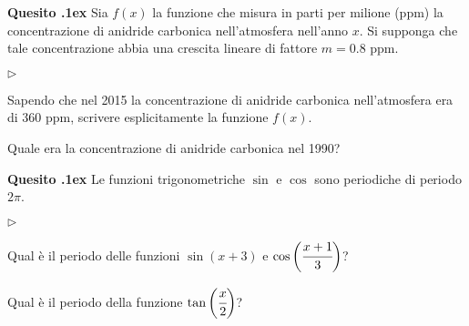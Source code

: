 \documentclass[11pt,twoside,a4paper]{article}
\newcommand{\mylabel}[1]{#1\hfill}
\renewenvironment{itemize}
  {\begin{list}{$\triangleright$}{%
   \setlength{\parskip}{0mm}
   \setlength{\topsep}{.4\baselineskip}
   \setlength{\rightmargin}{0mm}
   \setlength{\listparindent}{0mm}
   \setlength{\itemindent}{0mm}
   \setlength{\labelwidth}{2ex}
   \setlength{\itemsep}{.4\baselineskip}
   \setlength{\parsep}{0mm}
   \setlength{\partopsep}{0mm}
   \setlength{\labelsep}{1ex}
   \setlength{\leftmargin}{\labelwidth+\labelsep}
   \let\makelabel\mylabel}}{%
   \end{list}\vspace*{-1.3mm}}
\newcounter{quesito}
\newenvironment{question}{\bigskip\addtocounter{quesito}{1}\bigskip\bigskip\par\textbf{Quesito \thequesito.\kern1ex}}{\vspace{\parskip}}
\newenvironment{answer}{\par\textbf{Risposta\quad}}{\vspace{\parskip}}
\begin{document}
\begin{question}
Sia $f(x)$ la funzione che misura in parti per milione (ppm) la concentrazione di anidride carbonica nell'atmosfera nell'anno $x$. Si supponga che tale concentrazione abbia una crescita lineare di fattore $m = 0.8$ ppm.
\begin{itemize}
\item[1.] Sapendo che nel 2015 la concentrazione di anidride carbonica nell'atmosfera era di 360 ppm, scrivere esplicitamente la funzione $f(x)$.
\item[2.] Quale era la concentrazione di anidride carbonica nel 1990?
\end{itemize}
\end{question}

\begin{question}
Le funzioni trigonometriche $\sin$ e $\cos$ sono periodiche di periodo $2 \pi$.
\begin{itemize}
\item[1.] Qual \`e il periodo delle funzioni $\sin \left( x+3 \right)$ e $\cos \bigg( \cfrac{x+1}{3} \bigg)$?
\item[2.] Qual \`e il periodo della funzione $\tan \bigg( \cfrac{x}{2} \bigg)$?
\end{itemize}
\end{question}

%
%
%
%
%
%
%
%
%
\end{document}
